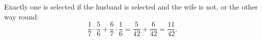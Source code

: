 Exactly one is selected if the husband is selected and the wife is not, or the other way round:
\[
\dfrac{1}{7}\cdot\dfrac{5}{6}+\dfrac{6}{7}\cdot\dfrac{1}{6}=\dfrac{5}{42}+\dfrac{6}{42}=\boxed{\dfrac{11}{42}}.
\]
